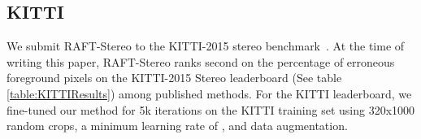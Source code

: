 \documentclass[10pt,twocolumn,letterpaper]{article}
\begin{document}
\subsection{KITTI}
\setlength\tabcolsep{.4em}
\begin{table}[t]
\centering
{}
\caption{Results on the KITTI-2015 \cite{kitti} leaderboard. Only published results are included. Best results for each evaluation metric are bolded, second best are underlined. At the time of submission, RAFT-Stereo ranks second on the percentage of erroneous (EPE  px) foreground pixels among published methods. }
\label{table:KITTIResults}
\end{table}

We submit RAFT-Stereo to the KITTI-2015 stereo benchmark~\cite{kitti}.
At the time of writing this paper, RAFT-Stereo ranks second on the percentage of erroneous foreground pixels on the KITTI-2015 Stereo leaderboard (See table \ref{table:KITTIResults}) among published methods. For the KITTI leaderboard, we fine-tuned our method for 5k iterations on the KITTI training set using 320x1000 random crops, a minimum learning rate of , and data augmentation. 
\end{document}
